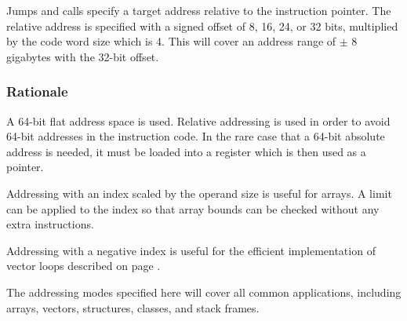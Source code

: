 \documentclass[forwardcom.tex]{subfiles}
\begin{document}
Jumps and calls specify a target address relative to the instruction pointer. The relative address is specified with a signed offset of 8, 16, 24, or 32 bits, multiplied by the code word size which is 4. This will cover an address range of
$\pm$ 8 gigabytes with the 32-bit offset.
\vv

\subsubsection{Rationale}
A 64-bit flat address space is used. Relative addressing is used in order to avoid 64-bit addresses in the instruction code. In the rare case that a 64-bit absolute address is needed, it must be loaded into a register which is then used as a pointer.
\vv

Addressing with an index scaled by the operand size is useful for arrays. A limit can be applied to the index so that array bounds can be checked without any extra instructions.
\vv

Addressing with a negative index is useful for the efficient implementation of vector loops described on page \pageref{vectorLoops}.
\vv

The addressing modes specified here will cover all common applications, including arrays, vectors, structures, classes, and stack frames.
\vv

\end{document}
